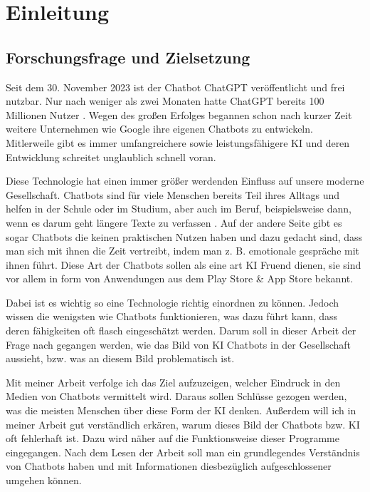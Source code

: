 \section{Einleitung}

	\subsection{Forschungsfrage und Zielsetzung}
	Seit dem 30. November 2023 ist der Chatbot ChatGPT veröffentlicht und frei nutzbar. 
	Nur nach weniger als zwei Monaten hatte ChatGPT bereits 100 Millionen Nutzer \cite[S. 15]{spitzer23}.
	Wegen des großen Erfolges begannen schon nach kurzer Zeit weitere Unternehmen wie Google ihre eigenen 
	Chatbots zu entwickeln. Mitlerweile gibt es immer umfangreichere sowie leistungsfähigere KI und
	deren Entwicklung schreitet unglaublich schnell voran.
	
	Diese Technologie hat einen immer größer werdenden Einfluss auf unsere moderne Gesellschaft. 
	Chatbots sind für viele Menschen bereits Teil ihres Alltags und helfen in der Schule oder
	im Studium, aber auch im Beruf, beispielsweise dann, wenn es darum geht längere Texte zu verfassen \cite[S. 175, S. 185]{shaji23}.
	Auf der andere Seite gibt es sogar Chatbots die keinen praktischen Nutzen haben und dazu gedacht
	sind, dass man sich mit ihnen die Zeit vertreibt, indem man z. B. emotionale gespräche mit ihnen 
	führt. Diese Art der Chatbots sollen als eine art KI Fruend dienen, sie sind vor allem in form
	von Anwendungen aus dem Play Store \& App Store bekannt.
	
	Dabei ist es wichtig so eine Technologie richtig einordnen zu können. Jedoch wissen die wenigsten
	wie Chatbots funktionieren, was dazu führt kann, dass deren fähigkeiten oft flasch eingeschätzt werden. 
	Darum soll in dieser Arbeit der Frage nach gegangen werden, wie das Bild von KI Chatbots in der 
	Gesellschaft aussieht, bzw. was an diesem Bild problematisch ist. 

	Mit meiner Arbeit verfolge ich das Ziel aufzuzeigen, welcher Eindruck in den Medien von Chatbots  
	vermittelt wird. Daraus sollen Schlüsse gezogen werden, was die meisten Menschen über diese Form 
	der KI denken. Außerdem will ich in meiner Arbeit gut verständlich erkären, warum dieses Bild der 
	Chatbots bzw. KI oft fehlerhaft ist. Dazu wird näher auf die Funktionsweise dieser Programme 
	eingegangen. Nach dem Lesen der Arbeit soll man ein grundlegendes Verständnis von Chatbots haben 
	und mit Informationen diesbezüglich aufgeschlossener umgehen können. 

